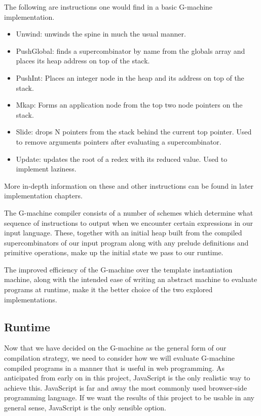 The following are instructions one would find in a
basic G-machine implementation. 

\begin{itemize}
	\item Unwind: unwinds the spine in much the usual
		  manner.
	\item PushGlobal: finds a supercombinator by name 
		  from the globals array and places its heap
		  address on top of the stack.
	\item PushInt: Places an integer node in the heap
		  and its address on top of the stack.
	\item Mkap: Forms an application node from the
		  top two node pointers on the stack.
	\item Slide: drops N pointers from the stack behind
		  the current top pointer. Used to remove
		  arguments pointers after evaluating a 
		  supercombinator.
	\item Update: updates the root of a redex with its
		  reduced value. Used to implement laziness.
\end{itemize}

\noindent More in-depth information on these and other 
instructions can be found in later implementation chapters. 

The G-machine compiler consists of a number of schemes which
determine what sequence of instructions to output when we
encounter certain expressions in our input language. These,
together with an initial heap built from the compiled 
supercombinators of our input program along with any prelude 
definitions and primitive operations, make up the initial
state we pass to our runtime.

The improved efficiency of the G-machine over the template
instantiation machine, along with the intended ease of writing
an abstract machine to evaluate programs at runtime, make
it the better choice of the two explored implementations.

\subsection{Runtime}
Now that we have decided on the G-machine as the general
form of our compilation strategy, we need to consider how
we will evaluate G-machine compiled programs in a manner
that is useful in web programming. As anticipated from
early on in this project, JavaScript is the only realistic
way to achieve this. JavaScript is far and away the most
commonly used browser-side programming language. If we
want the results of this project to be usable in any
general sense, JavaScript is the only sensible option.


